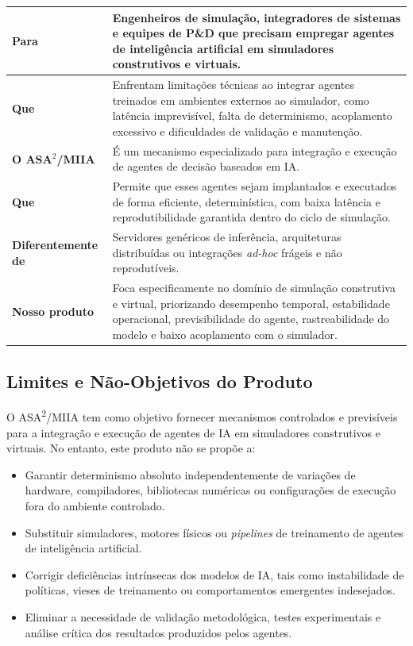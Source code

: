 \begin{table}[h]
    \begin{tabular}{|p{}|p{}|}
        \hline
            \textbf{Para} &
            Engenheiros de simulação, integradores de sistemas e equipes de P\&D que precisam empregar agentes de inteligência artificial em simuladores construtivos e virtuais. \\
        \hline
            \textbf{Que} &
            Enfrentam limitações técnicas ao integrar agentes treinados em ambientes externos ao simulador, como latência imprevisível, falta de determinismo, acoplamento excessivo e dificuldades de validação e manutenção. \\
        \hline
            \textbf{O ASA$^{2}$/MIIA} &
            É um mecanismo especializado para integração e execução de agentes de decisão baseados em IA. \\
        \hline
            \textbf{Que} &
            Permite que esses agentes sejam implantados e executados de forma eficiente, determinística, com baixa latência e reprodutibilidade garantida dentro do ciclo de simulação. \\
        \hline
            \textbf{Diferentemente de} &
            Servidores genéricos de inferência, arquiteturas distribuídas ou integrações \emph{ad-hoc} frágeis e não reprodutíveis. \\
        \hline
            \textbf{Nosso produto} &
            Foca especificamente no domínio de simulação construtiva e virtual, priorizando desempenho temporal, estabilidade operacional, previsibilidade do agente, rastreabilidade do modelo e baixo acoplamento com o simulador. \\
        \hline
    \end{tabular}
\end{table}

\subsection{Limites e Não-Objetivos do Produto}

O ASA\textsuperscript{2}/MIIA tem como objetivo fornecer mecanismos controlados e previsíveis para a integração e execução de agentes de IA em simuladores construtivos e virtuais. No entanto, este produto não se propõe a:

\begin{itemize}
    \item Garantir determinismo absoluto independentemente de variações de hardware, compiladores, bibliotecas numéricas ou configurações de execução fora do ambiente controlado.
    \item Substituir simuladores, motores físicos ou \emph{pipelines} de treinamento de agentes de inteligência artificial.
    \item Corrigir deficiências intrínsecas dos modelos de IA, tais como instabilidade de políticas, vieses de treinamento ou comportamentos emergentes indesejados.
    \item Eliminar a necessidade de validação metodológica, testes experimentais e análise crítica dos resultados produzidos pelos agentes.
\end{itemize}

